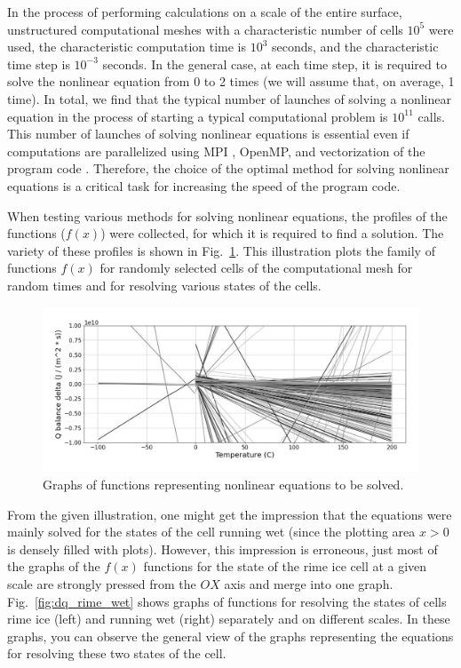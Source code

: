\documentclass[
11pt,%
tightenlines,%
twoside,%
onecolumn,%
nofloats,%
nobibnotes,%
nofootinbib,%
superscriptaddress,%
noshowpacs,%
centertags]%
{revtex4}
\begin{document}
In the process of performing calculations on a scale of the entire surface, unstructured computational meshes with a characteristic number of cells $10^5 $ were used, the characteristic computation time is $10^3$ seconds, and the characteristic time step is $10^{-3}$ seconds.
In the general case, at each time step, it is required to solve the nonlinear equation from 0 to 2 times (we will assume that, on average, 1 time).
In total, we find that the typical number of launches of solving a nonlinear equation in the process of starting a typical computational problem is $10^11$ calls.
This number of launches of solving nonlinear equations is essential even if computations are parallelized using MPI \cite{Kalantzis}, OpenMP, and vectorization of the program code \cite{Savin}.
Therefore, the choice of the optimal method for solving nonlinear equations is a critical task for increasing the speed of the program code.

When testing various methods for solving nonlinear equations, the profiles of the functions ($f(x)$) were collected, for which it is required to find a solution.
The variety of these profiles is shown in Fig.~\ref{fig:dq}.
This illustration plots the family of functions $f(x)$ for randomly selected cells of the computational mesh for random times and for resolving various states of the cells.

\begin{figure}[h]
\setcaptionmargin{5mm}
\onelinecaptionstrue
\includegraphics[width=1.0\textwidth]{pics/dq.pdf}
\caption{Graphs of functions representing nonlinear equations to be solved.}\label{fig:dq}
\end{figure}

From the given illustration, one might get the impression that the equations were mainly solved for the states of the cell running wet (since the plotting area $x > 0$ is densely filled with plots).
However, this impression is erroneous, just most of the graphs of the $f(x)$ functions for the state of the rime ice cell at a given scale are strongly pressed from the $OX$ axis and merge into one graph.
Fig.~\ref{fig:dq_rime_wet} shows graphs of functions for resolving the states of cells rime ice (left) and running wet (right) separately and on different scales.
In these graphs, you can observe the general view of the graphs representing the equations for resolving these two states of the cell.
\end{document}
